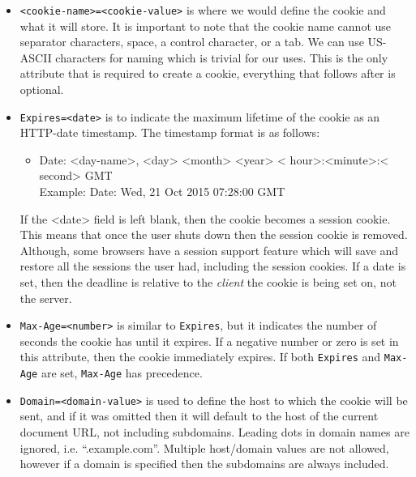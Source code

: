 \documentclass[
    paper=letter,
    parskip=half,
    fontsize=12pt,
    titlepage=firstiscover,
    toc=bibliography,
    numbers=endperiod
]{scrartcl}
\providecommand{\tightlist}{%
  \setlength{\itemsep}{0pt}\setlength{\parskip}{0pt}}
\begin{document}
\begin{itemize}
    \tightlist
    \item \texttt{\textless cookie-name\textgreater=\textless cookie-value\textgreater{}}
          is where we would define the cookie and what it will store. It is
          important to note that the cookie name cannot use separator
          characters, space, a control character, or a tab. We can use US-ASCII
          characters for naming which is trivial for our uses. This is the only
          attribute that is required to create a cookie, everything that follows
          after is optional.

    \item \texttt{Expires=\textless date\textgreater{}} is to indicate the
          maximum lifetime of the cookie as an HTTP-date timestamp. The
          timestamp format is as follows:
          \begin{itemize}
              \tightlist
              \item Date: \textless day-name\textgreater, \textless day\textgreater{}
                    \textless month\textgreater{} \textless year\textgreater{} \textless
                    hour\textgreater:\textless minute\textgreater:\textless
                    second\textgreater{} GMT\\ Example: Date: Wed, 21 Oct 2015 07:28:00 GMT
          \end{itemize}
          If the \textless date\textgreater{} field is left blank, then the cookie
          becomes a session cookie. This means that once the user shuts down then
          the session cookie is removed. Although, some browsers have a session
          support feature which will save and restore all the sessions the user
          had, including the session cookies. If a date is set, then the deadline
          is relative to the \emph{client} the cookie is being set on, not the
          server.

    \item \texttt{Max-Age=\textless number\textgreater{}} is similar to \texttt{Expires},
          but it indicates the number of seconds the cookie has until it
          expires. If a negative number or zero is set in this attribute, then
          the cookie immediately expires. If both \texttt{Expires} and \texttt{Max-Age} are set,
          \texttt{Max-Age} has precedence.

    \item \texttt{Domain=\textless domain-value\textgreater{}} is used to define
          the host to which the cookie will be sent, and if it was omitted then
          it will default to the host of the current document URL, not including
          subdomains. Leading dots in domain names are ignored, i.e.
          ``.example.com''. Multiple host/domain values are not allowed, however
          if a domain is specified then the subdomains are always included.


\end{itemize}
\end{document}
